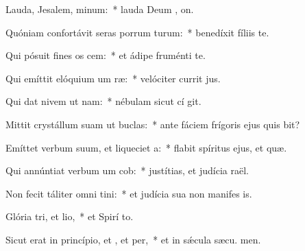 \item Lauda, Jesalem, minum:~* lauda Deum , on.
\item Quóniam confortávit seras porrum turum:~* benedíxit fíliis   te.
\item Qui pósuit fines os cem:~* et ádipe fruménti  te.
\item Qui emíttit elóquium um ræ:~* velóciter currit  jus.
\item Qui dat nivem ut nam:~* nébulam sicut cí git.
\item Mittit crystállum suam ut buclas:~* ante fáciem frígoris ejus quis bit?
\item Emíttet verbum suum, et liqueciet a:~* flabit spíritus ejus, et  quæ.
\item Qui annúntiat verbum um cob:~* justítias, et judícia  raël.
\item Non fecit táliter omni tini:~* et judícia sua non manifes is.
\item Glória tri, et lio,~* et Spirí to.
\item Sicut erat in princípio, et , et per,~* et in sǽcula sæcu. men.
